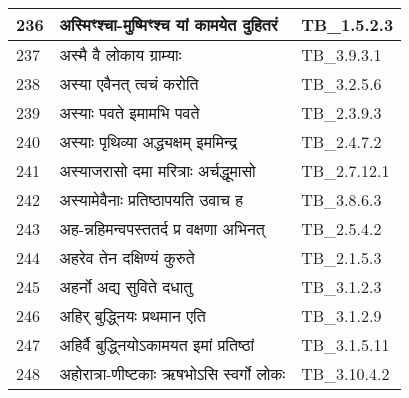 \documentclass[17pt]{extarticle}
\begin{document}
\begin{longtable}{||p{0.4in}||p{4.9in}||p{0.9in}||}
    \hline
        
    236 & अस्मिꣳश्चा{-}मुष्मिꣳश्च यां कामयेत दुहितरं & TB\_1.5.2.3       \\
    
    \hline
        
    237 & अस्मै वै लोकाय ग्राम्याः & TB\_3.9.3.1       \\
    
    \hline
        
    238 & अस्या एवैनत् त्वचं करोति & TB\_3.2.5.6       \\
    
    \hline
        
    239 & अस्याः पवते इमामभि पवते & TB\_2.3.9.3       \\
    
    \hline
        
    240 & अस्याः पृथिव्या अद्ध्यक्षम् इममिन्द्र & TB\_2.4.7.2       \\
    
    \hline
        
    241 & अस्याजरासो दमा मरित्राः अर्चद्धूमासो & TB\_2.7.12.1       \\
    
    \hline
        
    242 & अस्यामेवैनाः प्रतिष्ठापयति उवाच ह & TB\_3.8.6.3       \\
    
    \hline
        
    243 & अह{-}न्नहिमन्वपस्ततर्द प्र वक्षणा अभिनत् & TB\_2.5.4.2       \\
    
    \hline
        
    244 & अहरेव तेन दक्षिण्यं कुरुते & TB\_2.1.5.3       \\
    
    \hline
        
    245 & अहर्नो अद्य सुविते दधातु & TB\_3.1.2.3       \\
    
    \hline
        
    246 & अहिर् बुद्ध्नियः प्रथमान एति & TB\_3.1.2.9       \\
    
    \hline
        
    247 & अहिर्वै बुद्ध्नियोऽकामयत इमां प्रतिष्ठां & TB\_3.1.5.11       \\
    
    \hline
        
    248 & अहोरात्रा{-}णीष्टकाः ऋषभोऽसि स्वर्गो लोकः & TB\_3.10.4.2       \\
    

\end{longtable}
\end{document}
